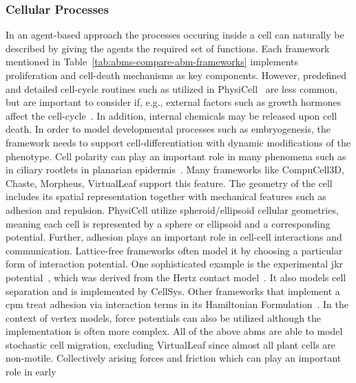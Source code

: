 \subsubsection*{Cellular Processes}
\label{subsec:abms-cellular-processes}\noindent
In an agent-based approach the processes occuring inside a cell can naturally be
described by giving the agents the required set of functions.
%
Each framework mentioned in Table~\ref{tab:abms-compare-abm-frameworks} implements
proliferation and cell-death mechanisms as key components.
However, predefined and detailed cell-cycle routines such as utilized in
PhysiCell~\cite{Ghaffarizadeh2018} are less common, but are important
to consider if, e.g., external factors such as growth hormones affect the
cell-cycle~\cite{Kassem1993}.
In addition, internal chemicals may be released upon cell death.
%
In order to model developmental processes such as embryogenesis, the framework needs to
support cell-differentiation with dynamic modifications of the phenotype.
%
Cell polarity can play an important role in many phenomena such as in ciliary rootlets in
planarian epidermis~\cite{Vu2019}.
Many frameworks like CompuCell3D, Chaste, Morpheus, VirtualLeaf support this feature.
%
The geometry of the cell includes its spatial representation together with mechanical
features such as adhesion and repulsion.
PhysiCell utilize spheroid/ellipsoid cellular geometries, meaning each cell is
represented by a sphere or ellipsoid and a corresponding potential.
Further, adhesion plays an important role in cell-cell interactions and communication.
Lattice-free frameworks often model it by choosing a particular form of interaction potential.
One sophisticated example is the experimental \ac{jkr}
potential~\cite{Johnson1971}, which was derived from the Hertz
contact model~\cite{Hertz1882}.
It also models cell separation and is implemented by CellSys.
Other frameworks that implement a \ac{cpm} treat adhesion via interaction terms in its
Hamiltonian Formulation~\cite{Maree2007}.
In the context of vertex models, force potentials can also be utilized although the
implementation is often more complex.
%
All of the above \acp{abm} are able to model stochastic cell migration, excluding
VirtualLeaf since almost all plant cells are non-motile.
Collectively arising forces and friction which can play an important role in early
